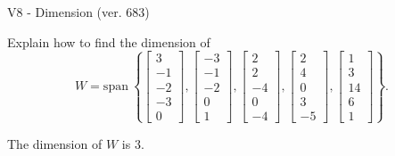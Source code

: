 \begin{exercise}
  \begin{exerciseTitle}V8 - Dimension (ver. 683)\end{exerciseTitle}
  \begin{exerciseStatement}
    Explain how to find the dimension of 
\[W=\mathrm{span}\ \left\{\left[\begin{array}{r}
3 \\
-1 \\
-2 \\
-3 \\
0
\end{array}\right] , \left[\begin{array}{r}
-3 \\
-1 \\
-2 \\
0 \\
1
\end{array}\right] , \left[\begin{array}{r}
2 \\
2 \\
-4 \\
0 \\
-4
\end{array}\right] , \left[\begin{array}{r}
2 \\
4 \\
0 \\
3 \\
-5
\end{array}\right] , \left[\begin{array}{r}
1 \\
3 \\
14 \\
6 \\
1
\end{array}\right]\right\}.\]



  \end{exerciseStatement}
  \begin{exerciseAnswer}
   The dimension of \(W\) is  \(3\).
  


  \end{exerciseAnswer}
\end{exercise}